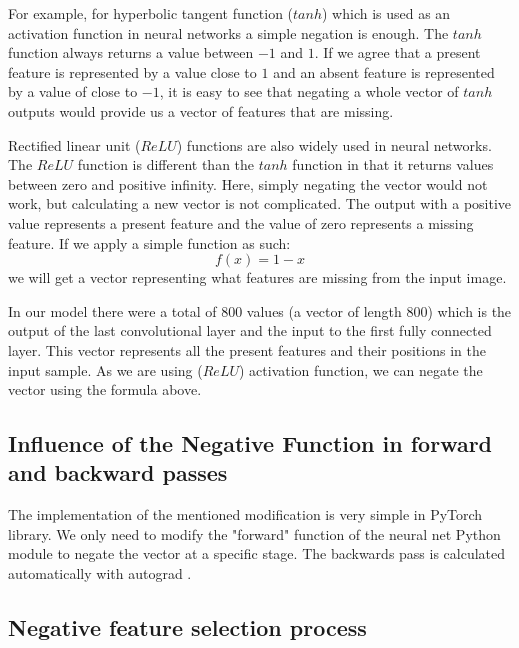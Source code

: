 \documentclass[b5paper]{book}
\let\cite\parencite
\begin{document}
For example, for hyperbolic tangent function (\(tanh\)) which is used as an activation function in neural networks a simple negation is enough. The \(tanh\) function always returns a value between \(-1\) and \(1\). If we agree that a present feature is represented by a value close to \(1\) and an absent feature is represented by a value of close to \(-1\), it is easy to see that negating a whole vector of \(tanh\) outputs would provide us a vector of features that are missing.

Rectified linear unit (\(ReLU\)) \cite{maas2013rectifier} functions are also widely used in neural networks. The \(ReLU\) function is different than the \(tanh\) function in that it returns values between zero and positive infinity. Here, simply negating the vector would not work, but calculating a new vector is not complicated. The output with a positive value represents a present feature and the value of zero represents a missing feature. If we apply a simple function as such:
%
\[
    f(x) = 1 - x
\]
%
we will get a vector representing what features are missing from the input image. 

In our model there were a total of 800 values (a vector of length 800) which is the output of the last convolutional layer and the input to the first fully connected layer. This vector represents all the present features and their positions in the input sample. As we are using (\(ReLU\)) activation function, we can negate the vector using the formula above.

\subsection{Influence of the Negative Function in forward and backward passes}

The implementation of the mentioned modification is very simple in PyTorch library. We only need to modify the "forward" function of the neural net Python module to negate the vector at a specific stage. The backwards pass is calculated automatically with autograd \cite{paszke2017automatic}.

\subsection{Negative feature selection process}
\end{document}
